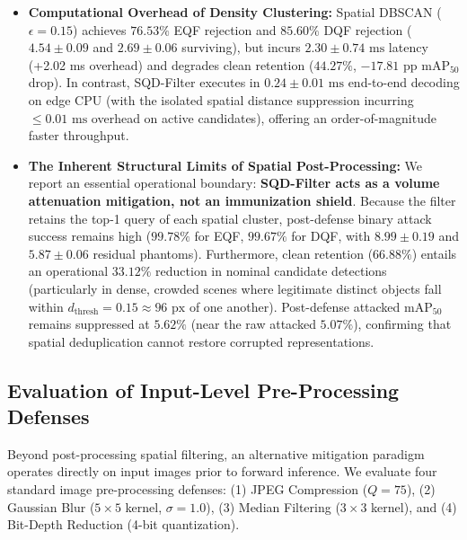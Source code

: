 \documentclass[preprint,12pt]{elsarticle}
\begin{document}
\begin{itemize}
    \item \textbf{Computational Overhead of Density Clustering:} Spatial DBSCAN ($\epsilon=0.15$) achieves $76.53\%$ EQF rejection and $85.60\%$ DQF rejection ($4.54 \pm 0.09$ and $2.69 \pm 0.06$ surviving), but incurs $2.30 \pm 0.74\text{ ms}$ latency (+2.02 ms overhead) and degrades clean retention ($44.27\%$, $-17.81\text{ pp}$ $\mathrm{mAP}_{50}$ drop). In contrast, SQD-Filter executes in $0.24 \pm 0.01\text{ ms}$ end-to-end decoding on edge CPU (with the isolated spatial distance suppression incurring $\le 0.01\text{ ms}$ overhead on active candidates), offering an order-of-magnitude faster throughput.
    \item \textbf{The Inherent Structural Limits of Spatial Post-Processing:} We report an essential operational boundary: \textbf{SQD-Filter acts as a volume attenuation mitigation, not an immunization shield}. Because the filter retains the top-1 query of each spatial cluster, post-defense binary attack success remains high ($99.78\%$ for EQF, $99.67\%$ for DQF, with $8.99 \pm 0.19$ and $5.87 \pm 0.06$ residual phantoms). Furthermore, clean retention ($66.88\%$) entails an operational $33.12\%$ reduction in nominal candidate detections (particularly in dense, crowded scenes where legitimate distinct objects fall within $d_{\mathrm{thresh}}=0.15 \approx 96\text{ px}$ of one another). Post-defense attacked $\mathrm{mAP}_{50}$ remains suppressed at $5.62\%$ (near the raw attacked $5.07\%$), confirming that spatial deduplication cannot restore corrupted representations.
\end{itemize}

\subsection{Evaluation of Input-Level Pre-Processing Defenses}
\label{sec:input_defenses}
Beyond post-processing spatial filtering, an alternative mitigation paradigm operates directly on input images prior to forward inference. We evaluate four standard image pre-processing defenses: (1) JPEG Compression ($Q=75$), (2) Gaussian Blur ($5\times 5$ kernel, $\sigma=1.0$), (3) Median Filtering ($3\times 3$ kernel), and (4) Bit-Depth Reduction (4-bit quantization).
\end{document}
